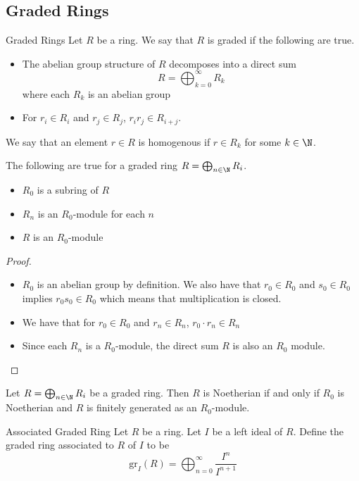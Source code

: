 \documentclass[a4paper]{article}
\begin{document}
\subsection{Graded Rings}
\begin{defn}{Graded Rings}{} Let $R$ be a ring. We say that $R$ is graded if the following are true. 
\begin{itemize}
\item The abelian group structure of $R$ decomposes into a direct sum $$R=\bigoplus_{k=0}^\infty R_k$$ where each $R_k$ is an abelian group 
\item For $r_i\in R_i$ and $r_j\in R_j$, $r_ir_j\in R_{i+j}$. 
\end{itemize}
We say that an element $r\in R$ is homogenous if $r\in R_k$ for some $k\in\N$. 
\end{defn}

\begin{prp}{}{} The following are true for a graded ring $R=\bigoplus_{n\in\N}R_i$. 
\begin{itemize}
\item $R_0$ is a subring of $R$
\item $R_n$ is an $R_0$-module for each $n$
\item $R$ is an $R_0$-module
\end{itemize} \tcbline
\begin{proof}~\\
\begin{itemize}
\item $R_0$ is an abelian group by definition. We also have that $r_0\in R_0$ and $s_0\in R_0$ implies $r_0s_0\in R_0$ which means that multiplication is closed. 
\item We have that for $r_0\in R_0$ and $r_n\in R_n$, $r_0\cdot r_n\in R_n$
\item Since each $R_n$ is a $R_0$-module, the direct sum $R$ is also an $R_0$ module. 
\end{itemize}
\end{proof}
\end{prp}

\begin{prp}{}{} Let $R=\bigoplus_{n\in\N}R_i$ be a graded ring. Then $R$ is Noetherian if and only if $R_0$ is Noetherian and $R$ is finitely generated as an $R_0$-module. 
\end{prp}

\begin{defn}{Associated Graded Ring}{} Let $R$ be a ring. Let $I$ be a left ideal of $R$. Define the graded ring associated to $R$ of $I$ to be $$\text{gr}_I(R)=\bigoplus_{n=0}^\infty\frac{I^n}{I^{n+1}}$$
\end{defn}
\end{document}
